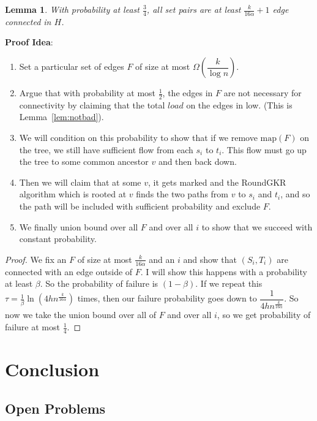 \documentclass[12pt]{article}
\newtheorem{lemma}{Lemma}
\begin{document}
\begin{lemma}
With probability at least $\frac{3}{4}$, all set pairs are at least $\frac{k}{16\alpha} + 1$ edge connected in $H$. 
\end{lemma}

\textbf{Proof Idea}:
\begin{enumerate}
\item Set a particular set of edges $F$ of size at most $\Omega(\dfrac{k}{\log n})$. 
\item Argue that with probability at most $\frac{1}{2}$, the edges in $F$ are not necessary for connectivity by claiming that the total $load$ on the edges in low. (This is Lemma~\ref{lem:notbad}). 
\item We will condition on this probability to show that if we remove $\text{map}(F)$ on the tree, we still have sufficient flow from each $s_i$ to $t_i$. This flow must go up the tree to some common ancestor $v$ and then back down.
\item Then we will claim that at some $v$, it gets marked and the RoundGKR algorithm which is rooted at $v$ finds the two paths from $v$ to $s_i$ and $t_i$, and so the path will be included with sufficient probability and exclude $F$.
\item We finally union bound over all $F$ and over all $i$ to show that we succeed with constant probability. 
\end{enumerate}

\begin{proof}
We fix an $F$ of size at most $\frac{k}{16\alpha}$ and an $i$ and show that $(S_i, T_i)$ are connected with an edge outside of $F$. I will show this happens with a probability at least $\beta$. So the probability of failure is $(1-\beta)$. If we repeat this $\tau = \frac{1}{\beta}\ln(4hn^{\frac{k}{16\alpha}})$ times, then our failure probability goes down to $\dfrac{1}{4hn^{\frac{k}{16\alpha}}}$. So now we take the union bound over all of $F$ and over all $i$, so we get probability of failure at most $\frac{1}{4}$.   
\end{proof}

\section{Conclusion}

\subsection{Open Problems}
\end{document}
